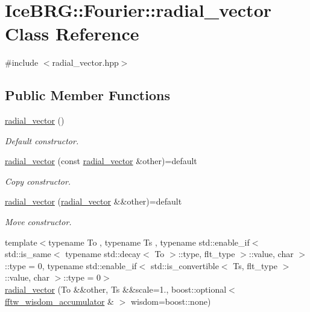 \hypertarget{classIceBRG_1_1Fourier_1_1radial__vector}{}\section{Ice\+B\+R\+G\+:\+:Fourier\+:\+:radial\+\_\+vector Class Reference}
\label{classIceBRG_1_1Fourier_1_1radial__vector}


{\ttfamily \#include $<$radial\+\_\+vector.\+hpp$>$}

\subsection*{Public Member Functions}
\begin{DoxyCompactItemize}
\item 
\hyperlink{classIceBRG_1_1Fourier_1_1radial__vector_a4bd62a63fe41112d7f624f420ac42d9f}{radial\+\_\+vector} ()
\begin{DoxyCompactList}\small\item\em Default constructor. \end{DoxyCompactList}\item 
\hyperlink{classIceBRG_1_1Fourier_1_1radial__vector_a71019894516d58eae9bf6144e8900b86}{radial\+\_\+vector} (const \hyperlink{classIceBRG_1_1Fourier_1_1radial__vector}{radial\+\_\+vector} \&other)=default
\begin{DoxyCompactList}\small\item\em Copy constructor. \end{DoxyCompactList}\item 
\hyperlink{classIceBRG_1_1Fourier_1_1radial__vector_aaef0714b69b1143c5be9ac40bdc1c3b0}{radial\+\_\+vector} (\hyperlink{classIceBRG_1_1Fourier_1_1radial__vector}{radial\+\_\+vector} \&\&other)=default
\begin{DoxyCompactList}\small\item\em Move constructor. \end{DoxyCompactList}\item 
{\footnotesize template$<$typename To , typename Ts , typename std\+::enable\+\_\+if$<$ std\+::is\+\_\+same$<$ typename std\+::decay$<$ To $>$\+::type, flt\+\_\+type $>$\+::value, char $>$\+::type  = 0, typename std\+::enable\+\_\+if$<$ std\+::is\+\_\+convertible$<$ Ts, flt\+\_\+type $>$\+::value, char $>$\+::type  = 0$>$ }\\\hyperlink{classIceBRG_1_1Fourier_1_1radial__vector_ab7ea2998e5c46b5daad6bac7513ace23}{radial\+\_\+vector} (To \&\&other, Ts \&\&scale=1., boost\+::optional$<$ \hyperlink{classIceBRG_1_1Fourier_1_1fftw__wisdom__accumulator}{fftw\+\_\+wisdom\+\_\+accumulator} \& $>$ wisdom=boost\+::none)

\end{DoxyCompactItemize}
